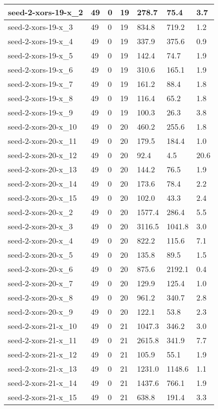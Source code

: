\begin{scriptsize}
\begin{longtable}{|p{5cm}|l|l|l|l|l|l|}
seed-2-xors-19-x\_2&49&0&19&278.7&75.4&3.7 \\ \hline 
seed-2-xors-19-x\_3&49&0&19&834.8&719.2&1.2 \\ \hline 
seed-2-xors-19-x\_4&49&0&19&337.9&375.6&0.9 \\ \hline 
seed-2-xors-19-x\_5&49&0&19&142.4&74.7&1.9 \\ \hline 
seed-2-xors-19-x\_6&49&0&19&310.6&165.1&1.9 \\ \hline 
seed-2-xors-19-x\_7&49&0&19&161.2&88.4&1.8 \\ \hline 
seed-2-xors-19-x\_8&49&0&19&116.4&65.2&1.8 \\ \hline 
seed-2-xors-19-x\_9&49&0&19&100.3&26.3&3.8 \\ \hline 
seed-2-xors-20-x\_10&49&0&20&460.2&255.6&1.8 \\ \hline 
seed-2-xors-20-x\_11&49&0&20&179.5&184.4&1.0 \\ \hline 
seed-2-xors-20-x\_12&49&0&20&92.4&4.5&20.6 \\ \hline 
seed-2-xors-20-x\_13&49&0&20&144.2&76.5&1.9 \\ \hline 
seed-2-xors-20-x\_14&49&0&20&173.6&78.4&2.2 \\ \hline 
seed-2-xors-20-x\_15&49&0&20&102.0&43.3&2.4 \\ \hline 
seed-2-xors-20-x\_2&49&0&20&1577.4&286.4&5.5 \\ \hline 
seed-2-xors-20-x\_3&49&0&20&3116.5&1041.8&3.0 \\ \hline 
seed-2-xors-20-x\_4&49&0&20&822.2&115.6&7.1 \\ \hline 
seed-2-xors-20-x\_5&49&0&20&135.8&89.5&1.5 \\ \hline 
seed-2-xors-20-x\_6&49&0&20&875.6&2192.1&0.4 \\ \hline 
seed-2-xors-20-x\_7&49&0&20&129.9&125.4&1.0 \\ \hline 
seed-2-xors-20-x\_8&49&0&20&961.2&340.7&2.8 \\ \hline 
seed-2-xors-20-x\_9&49&0&20&122.1&53.8&2.3 \\ \hline 
seed-2-xors-21-x\_10&49&0&21&1047.3&346.2&3.0 \\ \hline 
seed-2-xors-21-x\_11&49&0&21&2615.8&341.9&7.7 \\ \hline 
seed-2-xors-21-x\_12&49&0&21&105.9&55.1&1.9 \\ \hline 
seed-2-xors-21-x\_13&49&0&21&1231.0&1148.6&1.1 \\ \hline 
seed-2-xors-21-x\_14&49&0&21&1437.6&766.1&1.9 \\ \hline 
seed-2-xors-21-x\_15&49&0&21&638.8&191.4&3.3 \\ \hline 

\end{longtable}
\end{scriptsize}
